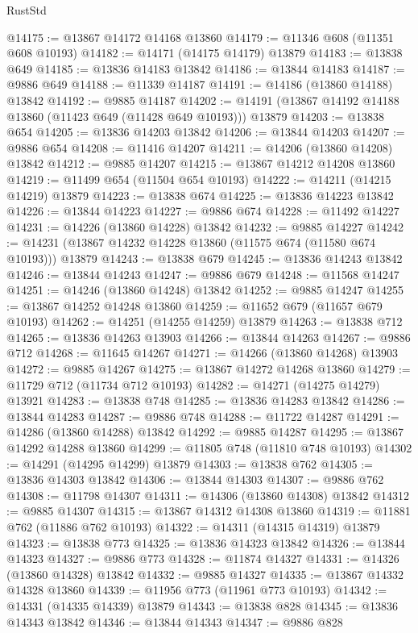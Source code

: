\begin{lexlean}{RustStd}
\begin{coremodule}
@14175 := @13867 @14172 @14168 @13860
@14179 := @11346 @608 (@11351 @608 @10193)
@14182 := @14171 (@14175 @14179) @13879
@14183 := @13838 @649
@14185 := @13836 @14183 @13842
@14186 := @13844 @14183
@14187 := @9886 @649
@14188 := @11339 @14187
@14191 := @14186 (@13860 @14188) @13842
@14192 := @9885 @14187
@14202 := @14191 (@13867 @14192 @14188 @13860 (@11423 @649 (@11428 @649 @10193))) @13879
@14203 := @13838 @654
@14205 := @13836 @14203 @13842
@14206 := @13844 @14203
@14207 := @9886 @654
@14208 := @11416 @14207
@14211 := @14206 (@13860 @14208) @13842
@14212 := @9885 @14207
@14215 := @13867 @14212 @14208 @13860
@14219 := @11499 @654 (@11504 @654 @10193)
@14222 := @14211 (@14215 @14219) @13879
@14223 := @13838 @674
@14225 := @13836 @14223 @13842
@14226 := @13844 @14223
@14227 := @9886 @674
@14228 := @11492 @14227
@14231 := @14226 (@13860 @14228) @13842
@14232 := @9885 @14227
@14242 := @14231 (@13867 @14232 @14228 @13860 (@11575 @674 (@11580 @674 @10193))) @13879
@14243 := @13838 @679
@14245 := @13836 @14243 @13842
@14246 := @13844 @14243
@14247 := @9886 @679
@14248 := @11568 @14247
@14251 := @14246 (@13860 @14248) @13842
@14252 := @9885 @14247
@14255 := @13867 @14252 @14248 @13860
@14259 := @11652 @679 (@11657 @679 @10193)
@14262 := @14251 (@14255 @14259) @13879
@14263 := @13838 @712
@14265 := @13836 @14263 @13903
@14266 := @13844 @14263
@14267 := @9886 @712
@14268 := @11645 @14267
@14271 := @14266 (@13860 @14268) @13903
@14272 := @9885 @14267
@14275 := @13867 @14272 @14268 @13860
@14279 := @11729 @712 (@11734 @712 @10193)
@14282 := @14271 (@14275 @14279) @13921
@14283 := @13838 @748
@14285 := @13836 @14283 @13842
@14286 := @13844 @14283
@14287 := @9886 @748
@14288 := @11722 @14287
@14291 := @14286 (@13860 @14288) @13842
@14292 := @9885 @14287
@14295 := @13867 @14292 @14288 @13860
@14299 := @11805 @748 (@11810 @748 @10193)
@14302 := @14291 (@14295 @14299) @13879
@14303 := @13838 @762
@14305 := @13836 @14303 @13842
@14306 := @13844 @14303
@14307 := @9886 @762
@14308 := @11798 @14307
@14311 := @14306 (@13860 @14308) @13842
@14312 := @9885 @14307
@14315 := @13867 @14312 @14308 @13860
@14319 := @11881 @762 (@11886 @762 @10193)
@14322 := @14311 (@14315 @14319) @13879
@14323 := @13838 @773
@14325 := @13836 @14323 @13842
@14326 := @13844 @14323
@14327 := @9886 @773
@14328 := @11874 @14327
@14331 := @14326 (@13860 @14328) @13842
@14332 := @9885 @14327
@14335 := @13867 @14332 @14328 @13860
@14339 := @11956 @773 (@11961 @773 @10193)
@14342 := @14331 (@14335 @14339) @13879
@14343 := @13838 @828
@14345 := @13836 @14343 @13842
@14346 := @13844 @14343
@14347 := @9886 @828

\end{coremodule}
\end{lexlean}
